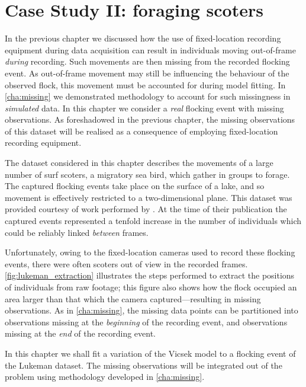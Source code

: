 \graphicspath{{fig/scoters/}}

\chapter{Case Study II: foraging scoters}
\label{cha:scoters}

In the previous chapter we discussed how the use of fixed-location recording
equipment during data acquisition can result in individuals moving out-of-frame
\emph{during} recording. Such movements are then missing from the recorded
flocking event. As out-of-frame movement may still be influencing the behaviour
of the observed flock, this movement must be accounted for during model
fitting. In \cref{cha:missing} we demonstrated methodology to account for such
missingness in \emph{simulated} data. In this chapter we consider a \emph{real}
flocking event with missing observations. As foreshadowed in the previous
chapter, the missing observations of this dataset will be realised as a
consequence of employing fixed-location recording equipment.

The dataset considered in this chapter describes the movements of a large
number of surf scoters, a migratory sea bird, which gather in groups to forage.
The captured flocking events take place on the surface of a lake, and so
movement is effectively restricted to a two-dimensional plane. This dataset was
provided courtesy of work performed by \textcite{lukeman09,lukeman10}. At the
time of their publication the captured events represented a tenfold increase in
the number of individuals which could be reliably linked \emph{between} frames.

Unfortunately, owing to the fixed-location cameras used to record these
flocking events, there were often scoters out of view in the recorded frames.
\cref{fig:lukeman_extraction} illustrates the steps performed to extract the
positions of individuals from raw footage; this figure also shows how the flock
occupied an area larger than that which the camera captured---resulting in
missing observations. As in \cref{cha:missing}, the missing data points can be
partitioned into observations missing at the \emph{beginning} of the recording
event, and observations missing at the \emph{end} of the recording event.

In this chapter we shall fit a variation of the Vicsek model to a
flocking event of the Lukeman dataset. The missing observations will be
integrated out of the problem using methodology developed in
\cref{cha:missing}.


